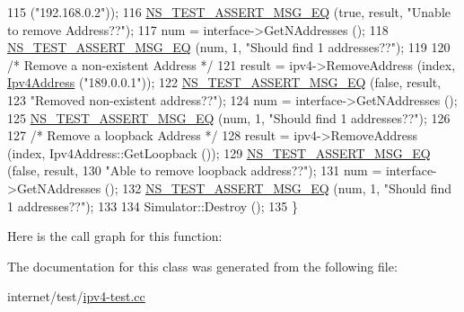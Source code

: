 \begin{DoxyCode}
115 (\textcolor{stringliteral}{"192.168.0.2"}));
116   \hyperlink{group__testing_ga2a9d78cffb3db8e867c35fff0b698cf5}{NS\_TEST\_ASSERT\_MSG\_EQ} (\textcolor{keyword}{true}, result, \textcolor{stringliteral}{"Unable to remove Address??"});
117   num = interface->GetNAddresses ();
118   \hyperlink{group__testing_ga2a9d78cffb3db8e867c35fff0b698cf5}{NS\_TEST\_ASSERT\_MSG\_EQ} (num, 1, \textcolor{stringliteral}{"Should find 1 addresses??"});
119 
120   \textcolor{comment}{/* Remove a non-existent Address */}
121   result = ipv4->RemoveAddress (index, \hyperlink{classns3_1_1Ipv4Address}{Ipv4Address} (\textcolor{stringliteral}{"189.0.0.1"}));
122   \hyperlink{group__testing_ga2a9d78cffb3db8e867c35fff0b698cf5}{NS\_TEST\_ASSERT\_MSG\_EQ} (\textcolor{keyword}{false}, result,
123                          \textcolor{stringliteral}{"Removed non-existent address??"});
124   num = interface->GetNAddresses ();
125   \hyperlink{group__testing_ga2a9d78cffb3db8e867c35fff0b698cf5}{NS\_TEST\_ASSERT\_MSG\_EQ} (num, 1, \textcolor{stringliteral}{"Should find 1 addresses??"});
126 
127   \textcolor{comment}{/* Remove a loopback Address */}
128   result = ipv4->RemoveAddress (index, Ipv4Address::GetLoopback ());
129   \hyperlink{group__testing_ga2a9d78cffb3db8e867c35fff0b698cf5}{NS\_TEST\_ASSERT\_MSG\_EQ} (\textcolor{keyword}{false}, result,
130                          \textcolor{stringliteral}{"Able to remove loopback address??"});
131   num = interface->GetNAddresses ();
132   \hyperlink{group__testing_ga2a9d78cffb3db8e867c35fff0b698cf5}{NS\_TEST\_ASSERT\_MSG\_EQ} (num, 1, \textcolor{stringliteral}{"Should find 1 addresses??"});
133 
134   Simulator::Destroy ();
135 \}
\end{DoxyCode}


Here is the call graph for this function\+:




The documentation for this class was generated from the following file\+:\begin{DoxyCompactItemize}
\item 
internet/test/\hyperlink{ipv4-test_8cc}{ipv4-\/test.\+cc}\end{DoxyCompactItemize}
